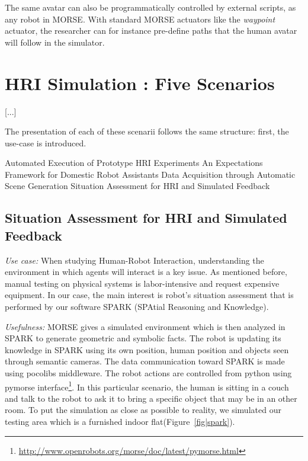 \documentclass[conference]{IEEEtran}
\begin{document}
The same avatar can also be programmatically controlled by external scripts, as
any robot in MORSE. With standard MORSE actuators like the \emph{waypoint} actuator,
the researcher can for instance pre-define paths that the human avatar will
follow in the simulator.



\section{HRI Simulation : Five Scenarios}

[...]

The presentation of each of these scenarii follows the same structure: first,
the use-case is introduced.


Automated Execution of Prototype HRI Experiments
An Expectations Framework for Domestic Robot Assistants
Data Acquisition through Automatic Scene Generation
Situation Assessment for HRI and Simulated Feedback

\subsection{Situation Assessment for HRI and Simulated Feedback}
\label{sc:assessment}

\emph{Use case:} When studying Human-Robot Interaction, understanding the environment in which
agents will interact is a key issue. As mentioned before, manual testing on
physical systems is labor-intensive and request expensive equipment.
In our case, the main interest is robot's situation assessment that is performed 
by our software SPARK (SPAtial Reasoning and Knowledge). 

\emph{Usefulness:} MORSE gives a simulated environment which is then analyzed in
 SPARK to generate geometric and symbolic facts. The robot is updating its
knowledge in SPARK using its own position, human position and objects seen through
semantic cameras. The data communication toward SPARK is made using pocolibs
middleware. The robot actions are controlled from python using pymorse
interface\footnote{\url{http://www.openrobots.org/morse/doc/latest/pymorse.html}}.
In this particular scenario, the human is sitting in a couch and talk to the
robot to ask it to bring a specific object that may be in an other room.
To put the simulation as close as possible to reality, we simulated our testing
area which is a furnished indoor flat(Figure~\ref{fig|spark}).
\end{document}
